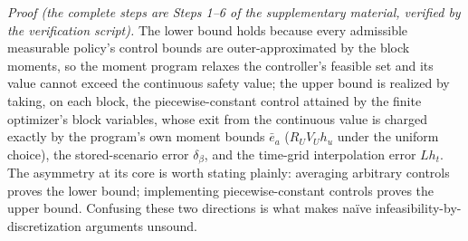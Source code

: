 \documentclass[10pt,twocolumn]{article}
\theoremstyle{plain}
\theoremstyle{definition}
\theoremstyle{remark}
\begin{document}
\emph{Proof (the complete steps are Steps 1--6 of the supplementary
material, verified by the verification script).} The lower bound holds because every admissible
measurable policy's control bounds are outer-approximated by the block
moments, so the moment program relaxes the controller's feasible set and
its value cannot exceed the continuous safety value; the upper bound is
realized by taking, on each block, the piecewise-constant control attained
by the finite optimizer's block variables, whose exit from the continuous
value is charged exactly by the program's own moment bounds \(\bar{e}_a\)
(\(R_U V_U h_u\) under the uniform choice), the stored-scenario error
\(\delta_\beta\), and the time-grid interpolation error \(L h_t\). The asymmetry at its core is
worth stating plainly: averaging arbitrary controls proves the lower bound;
implementing piecewise-constant controls proves the upper bound. Confusing
these two directions is what makes na\"ive infeasibility-by-discretization
arguments unsound.
\end{document}
